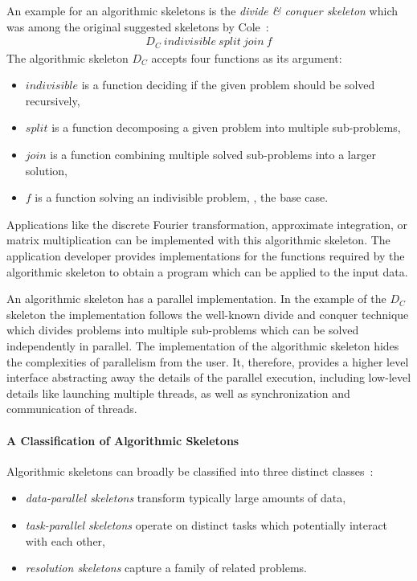 An example for an algorithmic skeletons is the \emph{divide \& conquer skeleton} which was among the original suggested skeletons by Cole~\cite{Cole1991}:
\begin{align*}
  D_C\ indivisible\ split\ join\ f%
\end{align*}
The algorithmic skeleton $D_C$ accepts four functions as its argument:
\begin{itemize}
  \item $indivisible$ is a function deciding if the given problem should be solved recursively,
  \item $split$ is a function decomposing a given problem into multiple sub-problems,
  \item $join$ is a function combining multiple solved sub-problems into a larger solution,
  \item $f$ is a function solving an indivisible problem, \ie, the base case.
\end{itemize}

Applications like the discrete Fourier transformation, approximate integration, or matrix multiplication can be implemented with this algorithmic skeleton.
The application developer provides implementations for the functions required by the algorithmic skeleton to obtain a program which can be applied to the input data.

An algorithmic skeleton has a parallel implementation.
In the example of the $D_C$ skeleton the implementation follows the well-known divide and conquer technique which divides problems into multiple sub-problems which can be solved independently in parallel.
The implementation of the algorithmic skeleton hides the complexities of parallelism from the user.
It, therefore, provides a higher level interface abstracting away the details of the parallel execution, including low-level details like launching multiple threads, as well as synchronization and communication of threads.

\paragraph{A Classification of Algorithmic Skeletons}
Algorithmic skeletons can broadly be classified into three distinct classes~\cite{}:
\begin{itemize}
  \item \emph{data-parallel skeletons} transform typically large amounts of data,
  \item \emph{task-parallel skeletons} operate on distinct tasks which potentially interact with each other,
  \item \emph{resolution skeletons} capture a family of related problems.
\end{itemize}

